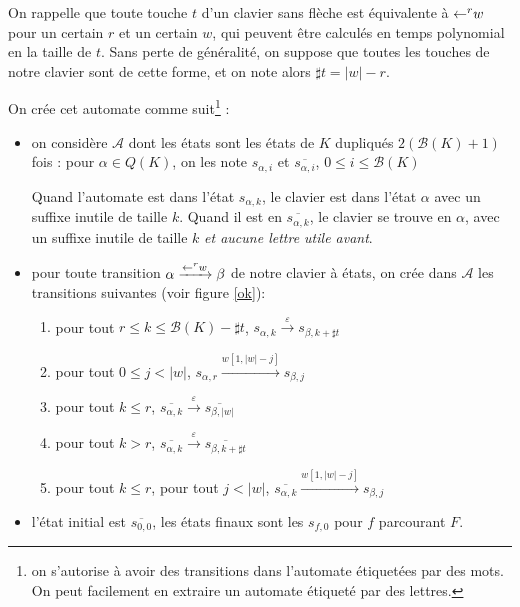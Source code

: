 \documentclass[12pt, a4paper]{article}
\renewcommand{\bar}{\overline}
\newcommand{\A}{\mathcal{A}}
\begin{document}
    On rappelle que \autocite[Lemme~74]{bible} toute touche $t$ d'un clavier sans flèche est équivalente à $\mathord{\leftarrow}^r w$ pour un certain $r$ et un certain $w$, qui peuvent être calculés en temps polynomial en la taille de $t$. Sans perte de généralité, on suppose que toutes les touches de notre clavier sont de cette forme, et on note alors $\sharp t = |w| - r$.
    
    On crée cet automate comme suit\footnote{on s'autorise à avoir des transitions dans l'automate étiquetées par des mots. On peut facilement en extraire un automate étiqueté par des lettres.} :
        \begin{itemize}
        \item on considère $\A$ dont les états sont les états de $K$ dupliqués $2(\mathcal{B}(K) + 1)$ fois : pour $\alpha \in Q(K)$, on les note $s_{\alpha, i}$ et $\overline{s_{\alpha, i}}$, $0 \leqslant i \leqslant \mathcal{B}(K)$
        \begin{example}[Intuition]    
            Quand l'automate est dans l'état $s_{\alpha,k}$, le clavier est dans l'état $\alpha$ avec un suffixe inutile de taille $k$. Quand il est en $\overline{s_{\alpha,k}}$, le clavier se trouve en $\alpha$, avec un suffixe inutile de taille $k$ \emph{et aucune lettre utile avant}. 
        \end{example}
        \item pour toute transition $\alpha \xrightarrow{\mathord{\leftarrow}^r w} \beta$ de notre clavier à états, on crée dans $\A$ les transitions suivantes (voir figure \ref{ok}):
            \begin{enumerate}
                \item pour tout $r \leqslant k \leqslant \mathcal{B}(K) - \sharp t$, $s_{\alpha, k} \xrightarrow{\varepsilon} s_{\beta, k + \sharp t}$
                \item pour tout $0 \leqslant j < |w|$, $s_{\alpha, r} \xrightarrow{w[1,|w|-j]} s_{\beta, j}$
                \item pour tout $k \leqslant r$, $\overline{s_{\alpha,k}} \xrightarrow{\varepsilon} \overline{s_{\beta,|w|}}$
                \item pour tout $k > r$, $\overline{s_{\alpha,k}} \xrightarrow{\varepsilon} \overline{s_{\beta,k+\sharp t}}$
                \item pour tout $k \leqslant r$, pour tout $j < |w|$, $\overline{s_{\alpha,k}} \xrightarrow{w[1,|w|-j]} s_{\beta, j}$
            \end{enumerate} 
        \item l'état initial est $\overline{s_{0,0}}$, les états finaux sont les $s_{f,0}$ pour $f$ parcourant $F$.
    \end{itemize}
    
\end{document}
